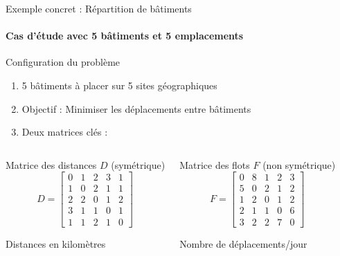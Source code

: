 \documentclass[10pt, handout]{beamer}
\begin{document}
\begin{frame}{Exemple concret : Répartition de bâtiments}
    \framesubtitle{Cas d'étude avec 5 bâtiments et 5 emplacements}

    \begin{block}{Configuration du problème}
        \begin{enumerate}
            \item 5 bâtiments à placer sur 5 sites géographiques
            \item Objectif : Minimiser les déplacements entre bâtiments
            \item Deux matrices clés :
        \end{enumerate}
    \end{block}

    \begin{columns}[T]
        \begin{exampleblock}{Matrice des distances \(D\) (symétrique)}
            \[
                D = \begin{bmatrix}
                    0 & 1 & 2 & 3 & 1 \\
                    1 & 0 & 2 & 1 & 1 \\
                    2 & 2 & 0 & 1 & 2 \\
                    3 & 1 & 1 & 0 & 1 \\
                    1 & 1 & 2 & 1 & 0
                \end{bmatrix}
            \]
            \begin{footnotesize}
                \begin{center}
                    Distances en kilomètres
                \end{center}
            \end{footnotesize}
        \end{exampleblock}

        \begin{exampleblock}{Matrice des flots \(F\) (non symétrique)}
            \[
                F = \begin{bmatrix}
                    0 & 8 & 1 & 2 & 3 \\
                    5 & 0 & 2 & 1 & 2 \\
                    1 & 2 & 0 & 1 & 2 \\
                    2 & 1 & 1 & 0 & 6 \\
                    3 & 2 & 2 & 7 & 0
                \end{bmatrix}
            \]
            \begin{footnotesize}
                \begin{center}
                    Nombre de déplacements/jour
                \end{center}
            \end{footnotesize}
        \end{exampleblock}
    \end{columns}

\end{frame}
\end{document}
